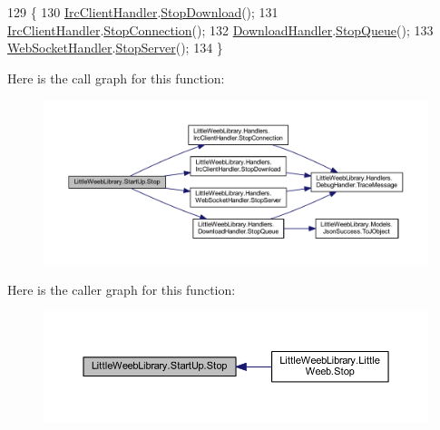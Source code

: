 \begin{DoxyCode}
129         \{
130             \mbox{\hyperlink{class_little_weeb_library_1_1_handlers_1_1_irc_client_handler}{IrcClientHandler}}.\mbox{\hyperlink{class_little_weeb_library_1_1_handlers_1_1_irc_client_handler_a265ca021f5086addf758e87f59a0aa11}{StopDownload}}();
131             \mbox{\hyperlink{class_little_weeb_library_1_1_handlers_1_1_irc_client_handler}{IrcClientHandler}}.\mbox{\hyperlink{class_little_weeb_library_1_1_handlers_1_1_irc_client_handler_a97a617b50a161906a91ce1ea483a1770}{StopConnection}}();
132             \mbox{\hyperlink{class_little_weeb_library_1_1_handlers_1_1_download_handler}{DownloadHandler}}.\mbox{\hyperlink{class_little_weeb_library_1_1_handlers_1_1_download_handler_a8fd807f023ed25e031844da3927e1a23}{StopQueue}}();
133             \mbox{\hyperlink{class_little_weeb_library_1_1_handlers_1_1_web_socket_handler}{WebSocketHandler}}.\mbox{\hyperlink{class_little_weeb_library_1_1_handlers_1_1_web_socket_handler_abcd87ac26780369b500299fc12aa0039}{StopServer}}();
134         \}
\end{DoxyCode}
Here is the call graph for this function\+:\nopagebreak
\begin{figure}[H]
\begin{center}
\leavevmode
\includegraphics[width=350pt]{class_little_weeb_library_1_1_start_up_aaa6147f0dd162c1962e575689dcb22c5_cgraph}
\end{center}
\end{figure}
Here is the caller graph for this function\+:\nopagebreak
\begin{figure}[H]
\begin{center}
\leavevmode
\includegraphics[width=350pt]{class_little_weeb_library_1_1_start_up_aaa6147f0dd162c1962e575689dcb22c5_icgraph}
\end{center}
\end{figure}


